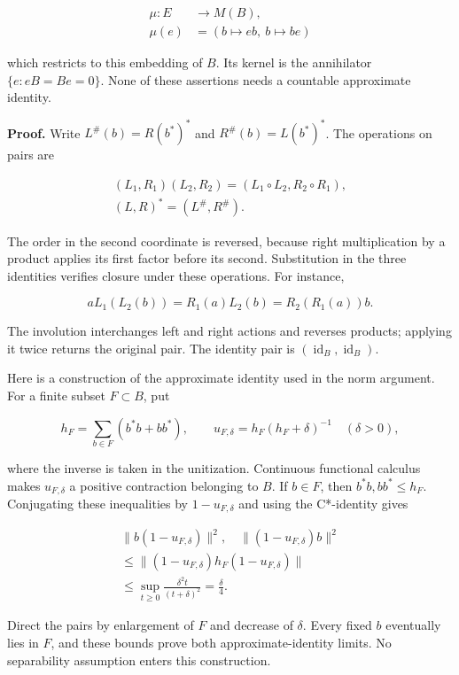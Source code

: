\documentclass[
  11pt,
]{article}
\begin{document}
\[
\begin{aligned}
\mu:E&\longrightarrow M(B),\\
\mu(e)&=(b\mapsto eb,\ b\mapsto be)
\end{aligned}
\]

which restricts to this embedding of \(B\). Its kernel is the
annihilator \(\{e:eB=Be=0\}\). None of these assertions needs a
countable approximate identity.

\textbf{Proof.} Write \(L^\#(b)=R(b^*)^*\) and \(R^\#(b)=L(b^*)^*\). The
operations on pairs are

\[
\begin{gathered}
(L_1,R_1)(L_2,R_2)
=(L_1\circ L_2,R_2\circ R_1),\\
(L,R)^*=(L^\#,R^\#).
\end{gathered}
\]

The order in the second coordinate is reversed, because right
multiplication by a product applies its first factor before its second.
Substitution in the three identities verifies closure under these
operations. For instance,

\[
aL_1(L_2(b))
=R_1(a)L_2(b)
=R_2(R_1(a))b.
\]

The involution interchanges left and right actions and reverses
products; applying it twice returns the original pair. The identity pair
is \((\operatorname{id}_B,\operatorname{id}_B)\).

Here is a construction of the approximate identity used in the norm
argument. For a finite subset \(F\subset B\), put

\[
h_F=\sum_{b\in F}(b^*b+bb^*),
\qquad u_{F,\delta}=h_F(h_F+\delta)^{-1}\quad(\delta>0),
\]

where the inverse is taken in the unitization. Continuous functional
calculus makes \(u_{F,\delta}\) a positive contraction belonging to
\(B\). If \(b\in F\), then \(b^*b,bb^*\leq h_F\). Conjugating these
inequalities by \(1-u_{F,\delta}\) and using the C*-identity gives

\[
\begin{gathered}
\|b(1-u_{F,\delta})\|^2,
\quad\|(1-u_{F,\delta})b\|^2\\
\leq\|(1-u_{F,\delta})h_F(1-u_{F,\delta})\|\\
\leq\sup_{t\geq0}\frac{\delta^2t}{(t+\delta)^2}
=\frac\delta4.
\end{gathered}
\]

Direct the pairs by enlargement of \(F\) and decrease of \(\delta\).
Every fixed \(b\) eventually lies in \(F\), and these bounds prove both
approximate-identity limits. No separability assumption enters this
construction.
\end{document}
